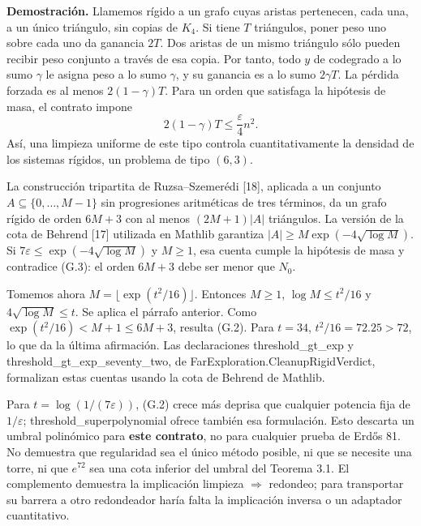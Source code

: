 \documentclass[spanish,11pt,a4paper]{article}
\begin{document}
\textbf{Demostración.} Llamemos rígido a un grafo cuyas aristas pertenecen, cada una, a un único triángulo, sin copias de \(K_4\). Si tiene \(T\) triángulos, poner peso uno sobre cada uno da ganancia \(2T\). Dos aristas de un mismo triángulo sólo pueden recibir peso conjunto a través de esa copia. Por tanto, todo \(y\) de codegrado a lo sumo \(\gamma\) le asigna peso a lo sumo \(\gamma\), y su ganancia es a lo sumo \(2\gamma T\). La pérdida forzada es al menos \(2(1-\gamma)T\). Para un orden que satisfaga la hipótesis de masa, el contrato impone \[
2(1-\gamma)T\le\frac{\varepsilon}{4}n^2.
\tag{G.3}
\] Así, una limpieza uniforme de este tipo controla cuantitativamente la densidad de los sistemas rígidos, un problema de tipo \((6,3)\).

La construcción tripartita de Ruzsa--Szemerédi {[}18{]}, aplicada a un conjunto \(A\subseteq\{0,\ldots,M-1\}\) sin progresiones aritméticas de tres términos, da un grafo rígido de orden \(6M+3\) con al menos \((2M+1)|A|\) triángulos. La versión de la cota de Behrend {[}17{]} utilizada en Mathlib garantiza \(|A|\ge M\exp(-4\sqrt{\log M})\). Si \(7\varepsilon\le\exp(-4\sqrt{\log M})\) y \(M\ge1\), esa cuenta cumple la hipótesis de masa y contradice (G.3): el orden \(6M+3\) debe ser menor que \(N_0\).

Tomemos ahora \(M=\lfloor\exp(t^2/16)\rfloor\). Entonces \(M\ge1\), \(\log M\le t^2/16\) y \(4\sqrt{\log M}\le t\). Se aplica el párrafo anterior. Como \(\exp(t^2/16)<M+1\le6M+3\), resulta (G.2). Para \(t=34\), \(t^2/16=72.25>72\), lo que da la última afirmación. Las declaraciones {\ttfamily\small threshold\_\discretionary{\hbox{\ensuremath{\hookrightarrow}}}{}{}gt\_\discretionary{\hbox{\ensuremath{\hookrightarrow}}}{}{}exp} y {\ttfamily\small threshold\_\discretionary{\hbox{\ensuremath{\hookrightarrow}}}{}{}gt\_\discretionary{\hbox{\ensuremath{\hookrightarrow}}}{}{}exp\_\discretionary{\hbox{\ensuremath{\hookrightarrow}}}{}{}seventy\_\discretionary{\hbox{\ensuremath{\hookrightarrow}}}{}{}two}, de {\ttfamily\small FarExplorati\discretionary{\hbox{\ensuremath{\hookrightarrow}}}{}{}on.\discretionary{\hbox{\ensuremath{\hookrightarrow}}}{}{}CleanupRigid\discretionary{\hbox{\ensuremath{\hookrightarrow}}}{}{}Verdict}, formalizan estas cuentas usando la cota de Behrend de Mathlib.

Para \(t=\log(1/(7\varepsilon))\), (G.2) crece más deprisa que cualquier potencia fija de \(1/\varepsilon\); {\ttfamily\small threshold\_\discretionary{\hbox{\ensuremath{\hookrightarrow}}}{}{}superpolynom\discretionary{\hbox{\ensuremath{\hookrightarrow}}}{}{}ial} ofrece también esa formulación. Esto descarta un umbral polinómico para \textbf{este contrato}, no para cualquier prueba de Erdős 81. No demuestra que regularidad sea el único método posible, ni que se necesite una torre, ni que \(e^{72}\) sea una cota inferior del umbral del Teorema 3.1. El complemento demuestra la implicación limpieza \(\Rightarrow\) redondeo; para transportar su barrera a otro redondeador haría falta la implicación inversa o un adaptador cuantitativo.
\end{document}

